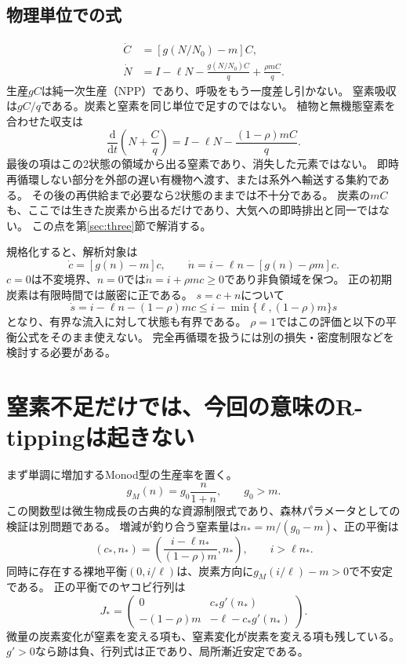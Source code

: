 \documentclass[a4paper,11pt]{ltjsarticle}
\newcommand{\dd}{\mathrm d}
\begin{document}
\subsection{物理単位での式}
\begin{equation}\boxed{\begin{aligned}
\dot C&=[g(N/N_0)-m]C,\\
\dot N&=I-\ell N-\frac{g(N/N_0)C}{q}+\frac{\rho mC}{q}.
\end{aligned}}\label{eq:physical}\end{equation}
生産$gC$は純一次生産（NPP）であり、呼吸をもう一度差し引かない。
窒素吸収は$gC/q$である。炭素と窒素を同じ単位で足すのではない。
植物と無機態窒素を合わせた収支は
\begin{equation}
\frac{\dd}{\dd t}\left(N+\frac Cq\right)
=I-\ell N-\frac{(1-\rho)mC}{q}.
\label{eq:budget}
\end{equation}
最後の項はこの2状態の領域から出る窒素であり、消失した元素ではない。
即時再循環しない部分を外部の遅い有機物へ渡す、または系外へ輸送する集約である。
その後の再供給まで必要なら2状態のままでは不十分である。
炭素の$mC$も、ここでは生きた炭素から出るだけであり、大気への即時排出と同一ではない。
この点を第\ref{sec:three}節で解消する。

規格化すると、解析対象は
\begin{equation}\boxed{\dot c=[g(n)-m]c,\qquad
\dot n=i-\ell n-[g(n)-\rho m]c.}\label{eq:two}\end{equation}
$c=0$は不変境界、$n=0$では$\dot n=i+\rho mc\geq0$であり非負領域を保つ。
正の初期炭素は有限時間では厳密に正である。
$s=c+n$について
\begin{equation}
\dot s=i-\ell n-(1-\rho)mc
\leq i-\min\{\ell,(1-\rho)m\}s
\end{equation}
となり、有界な流入に対して状態も有界である。
$\rho=1$ではこの評価と以下の平衡公式をそのまま使えない。
完全再循環を扱うには別の損失・密度制限などを検討する必要がある。

\section{窒素不足だけでは、今回の意味のR-tippingは起きない}
まず単調に増加するMonod型の生産率を置く。
\begin{equation}g_M(n)=g_0\frac n{1+n},\qquad g_0>m.\label{eq:monod}\end{equation}
この関数型は微生物成長の古典的な資源制限式であり、森林パラメータとしての検証は別問題である。
増減が釣り合う窒素量は$n_*=m/(g_0-m)$、正の平衡は
\begin{equation}
(c_*,n_*)=\left(\frac{i-\ell n_*}{(1-\rho)m},n_*\right),\qquad i>\ell n_*.
\end{equation}
同時に存在する裸地平衡$(0,i/\ell)$は、炭素方向に$g_M(i/\ell)-m>0$で不安定である。
正の平衡でのヤコビ行列は
\begin{equation}
J_*=\begin{pmatrix}0&c_*g'(n_*)\\
-(1-\rho)m&-\ell-c_*g'(n_*)\end{pmatrix}.
\label{eq:jac}
\end{equation}
微量の炭素変化が窒素を変える項も、窒素変化が炭素を変える項も残している。
$g'>0$なら跡は負、行列式は正であり、局所漸近安定である。
\end{document}
